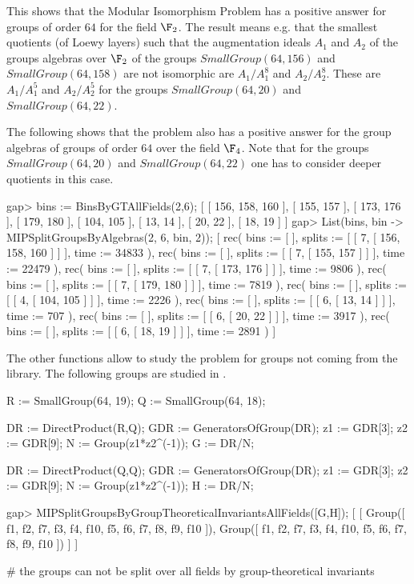 This shows that the Modular Isomorphism Problem has a positive answer for groups
of order $64$ for the field $\F_2$. The result means e.g. that the smallest quotients
(of Loewy layers)
such that the augmentation ideals $A_1$ and $A_2$ of the groups algebras over $\F_2$ of the
groups $SmallGroup(64, 156)$ and $SmallGroup(64, 158)$ are not isomorphic are $A_1/A_1^8$
and $A_2/A_2^8$. These are $A_1/A_1^5$ and $A_2/A_2^5$ for the groups
$SmallGroup(64, 20)$ and $SmallGroup(64, 22)$. 

The following shows that the problem also has a positive answer for the group
algebras of groups of order $64$ over the field $\F_4$. Note that for the groups
$SmallGroup(64, 20)$ and $SmallGroup(64, 22)$ one has to consider deeper quotients
in this case.

\beginexample
gap> bins := BinsByGTAllFields(2,6);
[ [ 156, 158, 160 ], [ 155, 157 ], [ 173, 176 ], [ 179, 180 ], [ 104, 105 ], 
  [ 13, 14 ], [ 20, 22 ], [ 18, 19 ] ]
gap> List(bins, bin -> MIPSplitGroupsByAlgebras(2, 6, bin, 2));
[ rec( bins := [  ], splits := [ [ 7, [ 156, 158, 160 ] ] ], time := 34833 ), 
  rec( bins := [  ], splits := [ [ 7, [ 155, 157 ] ] ], time := 22479 ), 
  rec( bins := [  ], splits := [ [ 7, [ 173, 176 ] ] ], time := 9806 ), 
  rec( bins := [  ], splits := [ [ 7, [ 179, 180 ] ] ], time := 7819 ), 
  rec( bins := [  ], splits := [ [ 4, [ 104, 105 ] ] ], time := 2226 ), 
  rec( bins := [  ], splits := [ [ 6, [ 13, 14 ] ] ], time := 707 ), 
  rec( bins := [  ], splits := [ [ 6, [ 20, 22 ] ] ], time := 3917 ), 
  rec( bins := [  ], splits := [ [ 6, [ 18, 19 ] ] ], time := 2891 ) ]

\endexample

The other functions allow to study the problem for groups not coming from the
library. The following groups are studied in \cite{GLM24}.

\beginexample
R := SmallGroup(64, 19);
Q := SmallGroup(64, 18);

DR := DirectProduct(R,Q);
GDR := GeneratorsOfGroup(DR);
z1 := GDR[3];
z2 := GDR[9];
N := Group(z1*z2^(-1));
G := DR/N;

DR := DirectProduct(Q,Q);
GDR := GeneratorsOfGroup(DR);
z1 := GDR[3];
z2 := GDR[9];
N := Group(z1*z2^(-1));
H := DR/N;

gap> MIPSplitGroupsByGroupTheoreticalInvariantsAllFields([G,H]);
[ [ Group([ f1, f2, f7, f3, f4, f10, f5, f6, f7, f8, f9, f10 ]), 
      Group([ f1, f2, f7, f3, f4, f10, f5, f6, f7, f8, f9, f10 ]) ] ]

# the groups can not be split over all fields by group-theoretical invariants


